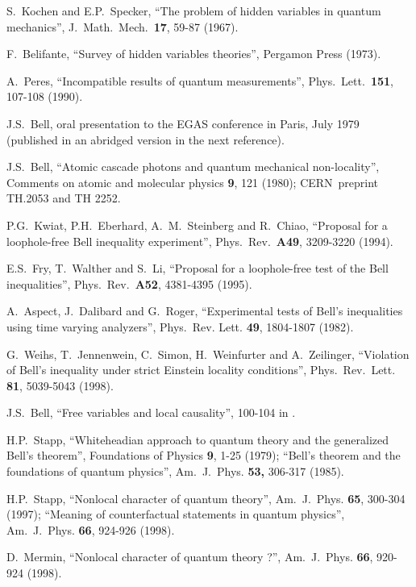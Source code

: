 \documentclass[12pt,onecolumn]{article}%
\begin{document}
\begin{thebibliography}{999}
S.\ Kochen and E.P.\ Specker, ``The problem of hidden
variables in quantum mechanics'', J.\ Math.\ Mech.\ \textbf{17}, 59-87 (1967).

F.\ Belifante, ``Survey of hidden variables theories'',
Pergamon Press (1973).

A.\ Peres, ``Incompatible results of quantum measurements'',
Phys.\ Lett.\ \textbf{151}, 107-108 (1990).

J.S.\ Bell, oral presentation to the EGAS conference in
Paris, July 1979 (published in an abridged version in the next reference).

J.S.\ Bell, ``Atomic cascade photons and quantum
mechanical non-locality'', Comments on atomic and molecular physics
\textbf{9}, 121 (1980); CERN\ preprint TH.2053 and TH 2252.

P.G.\ Kwiat, P.H.\ Eberhard, A.\ M.\ Steinberg and R.\ Chiao,
``Proposal for a loophole-free Bell inequality experiment'',
Phys.\ Rev.\ \textbf{A49}, 3209-3220 (1994).

E.S.\ Fry, T.\ Walther and S.\ Li, ``Proposal for a
loophole-free test of the Bell inequalities'', Phys.\ Rev.\ \textbf{A52},
4381-4395 (1995).

A.\ Aspect, J.\ Dalibard and G.\ Roger, ``Experimental
tests of Bell's inequalities using time varying analyzers'', Phys.\ Rev. Lett.
\textbf{49}, 1804-1807 (1982).

G.\ Weihs, T.\ Jennenwein, C.\ Simon, H.\ Weinfurter
and A.\ Zeilinger, ``Violation of Bell's inequality under strict Einstein
locality conditions'', Phys.\ Rev.\ Lett. \textbf{81}, 5039-5043 (1998).

J.S.\ Bell, ``Free variables and local causality'',
100-104 in \cite{Bell-livre}.

H.P.\ Stapp, ``Whiteheadian approach to quantum theory and the
generalized Bell's theorem'', Foundations of Physics \textbf{9}, 1-25 (1979);
``Bell's theorem and the foundations of quantum physics'', Am.\ J.\ Phys.
\textbf{53, }306-317 (1985).

H.P.\ Stapp, ``Nonlocal character of quantum theory'',
Am.\ J.\ Phys. \textbf{65}, 300-304 (1997); ``Meaning of counterfactual
statements in quantum physics'', Am.\ J.\ Phys. \textbf{66}, 924-926 (1998).

D.\ Mermin, ``Nonlocal character of quantum theory ?'',
Am.\ J.\ Phys. \textbf{66}, 920-924 (1998).


\end{thebibliography}
\end{document}
